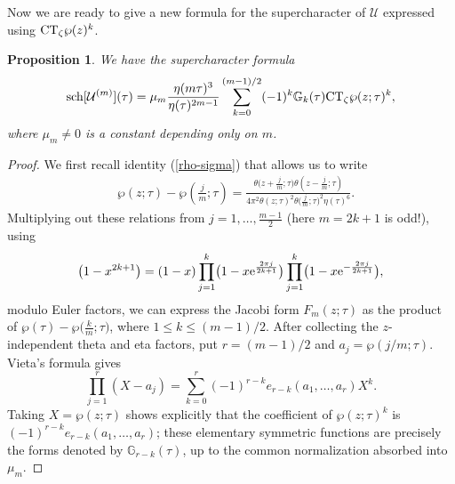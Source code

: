 \documentclass[10pt,a4paper]{amsart}
\numberwithin{equation}{section}
\newtheorem{Proposition}[Theorem]{Proposition}
\theoremstyle{definition}
\begin{document}
Now we are ready to give a new formula for the supercharacter of $\mathcal{U}$ expressed using
${\rm CT}_\zeta \wp(z)^k$. \begin{Proposition} \label{jacobi} We have the supercharacter formula
\[
{\rm sch}[\mathcal{U}^{(m)}](\tau)=\mu_m \frac{\eta(m \tau)^3}{\eta(\tau)^{2m-1}} \sum_{k=0}^{(m-1)/2} (-1)^k \mathbb{G}_k(\tau) {\rm CT}_\zeta \wp(z;\tau)^k,
\]
where $\mu_m \neq 0$ is a constant depending only on $m$.
\end{Proposition}
\begin{proof}
We first recall identity (\ref{rho-sigma}) that allows us to write
\begin{align*}
& \wp(z;\tau)-\wp\left(\frac{j}{m};\tau\right)= \frac{\theta\bigl(z+\frac{j}{m};\tau\bigr) \theta(z-\frac{j}{m};\tau)}{ 4 \pi^2 \theta(z;\tau)^2 \theta\bigl(\frac{j}{m};\tau\bigr)^2 \eta(\tau)^6}.
\end{align*}
Multiplying out these relations from $j=1,\dots,\frac{m-1}{2}$ (here $m=2k+1$ is odd!), using
\[
\bigl(1-x^{2k+1}\bigr)=(1-x)\prod_{j=1}^{k}\bigl(1-x {\rm e}^{\frac{2 \pi j }{2k+1}}\bigr)\prod_{j=1}^{k}\bigl(1-x {\rm e}^{-\frac{2 \pi j }{2k+1}}\bigr),
\]
 modulo Euler factors, we can express the Jacobi form $F_m(z;\tau)$ as the product of $\wp(\tau)-\wp\bigl(\frac{k}{m}; \tau\bigr)$, where $1 \leq k \leq (m-1)/2$. After collecting the $z$-independent theta and eta factors, put $r=(m-1)/2$ and $a_j=\wp(j/m;\tau)$. Vieta's formula gives
\[
\prod_{j=1}^{r}(X-a_j)=\sum_{k=0}^{r}(-1)^{r-k}e_{r-k}(a_1,\dots,a_r)X^k.
\]
Taking $X=\wp(z;\tau)$ shows explicitly that the coefficient of $\wp(z;\tau)^k$ is $(-1)^{r-k}e_{r-k}(a_1,\dots,a_r)$; these elementary symmetric functions are precisely the forms denoted by $\mathbb{G}_{r-k}(\tau)$, up to the common normalization absorbed into~$\mu_m$.
\end{proof}
\end{document}
